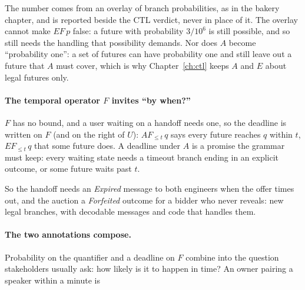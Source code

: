 The number comes from an overlay of branch probabilities, as in the bakery
chapter, and is reported beside the CTL verdict, never in place of it. The
overlay cannot make $EF\,p$ false: a future with probability $3/10^6$ is still
possible, and so still needs the handling that possibility demands. Nor does
$A$ become ``probability one'': a set of futures can have probability one and
still leave out a future that $A$ must cover, which is why
Chapter~\ref{ch:ctl} keeps $A$ and $E$ about legal futures only.

\paragraph{The temporal operator $F$ invites ``by when?''} $F$ has no bound, and a
user waiting on a handoff needs one, so the deadline is written on $F$ (and on
the right of $U$): $AF_{\le t}\,q$ says every future reaches $q$ within $t$,
$EF_{\le t}\,q$ that some future does. A deadline under $A$ is a promise the
grammar must keep: every waiting state needs a timeout branch ending in an
explicit outcome, or some future waits past $t$.



So the handoff needs an \emph{Expired} message to both engineers when the offer
times out, and the auction a \emph{Forfeited} outcome for a bidder who never
reveals: new legal branches, with decodable messages and code that handles them.

\paragraph{The two annotations compose.} Probability on the quantifier and a
deadline on $F$ combine into the question stakeholders usually ask: how likely
is it to happen in time? An owner pairing a speaker within a minute is


